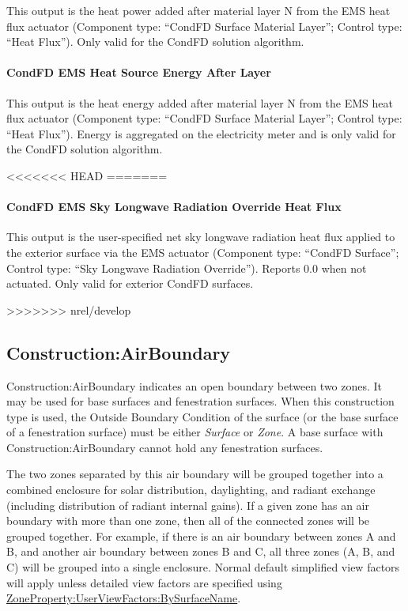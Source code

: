 This output is the heat power added after material layer N from the EMS heat flux actuator (Component type: ``CondFD Surface Material Layer''; Control type: ``Heat Flux''). Only valid for the CondFD solution algorithm.

\paragraph{CondFD EMS Heat Source Energy After Layer}

This output is the heat energy added after material layer N from the EMS heat flux actuator (Component type: ``CondFD Surface Material Layer''; Control type: ``Heat Flux''). Energy is aggregated on the electricity meter and is only valid for the CondFD solution algorithm.

<<<<<<< HEAD
=======
\paragraph{CondFD EMS Sky Longwave Radiation Override Heat Flux}

This output is the user-specified net sky longwave radiation heat flux applied to the exterior surface via the EMS actuator (Component type: ``CondFD Surface''; Control type: ``Sky Longwave Radiation Override''). Reports 0.0 when not actuated. Only valid for exterior CondFD surfaces.

>>>>>>> nrel/develop
\subsection{Construction:AirBoundary}\label{constructionairboundary}

Construction:AirBoundary indicates an open boundary between two zones. It may be used for base surfaces and fenestration surfaces.
When this construction type is used, the Outside Boundary Condition of the surface (or the base surface of a fenestration surface)
must be either \textit{Surface} or \textit{Zone}. A base surface with Construction:AirBoundary cannot hold any fenestration surfaces.

The two zones separated by this air boundary will be grouped together into a combined enclosure for solar distribution, daylighting, and radiant exchange (including distribution of radiant internal gains). If a given zone has an air boundary with more than one zone, then all of the connected zones will be grouped together. For example, if there is an air boundary between zones A and B, and another air boundary between zones B and C, all three zones (A, B, and C) will be grouped into a single enclosure. Normal default simplified view factors will apply unless detailed view factors are specified using \hyperref[zonepropertyuserviewfactorsbysurfacename]{ZoneProperty:UserViewFactors:BySurfaceName}.

